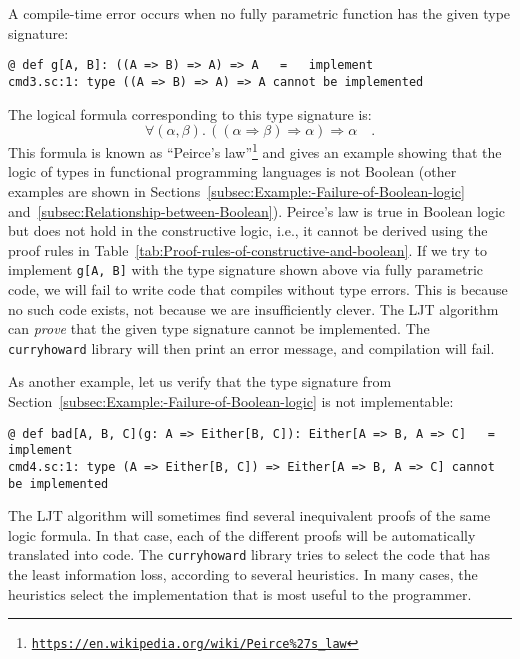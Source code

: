 A compile-time error occurs when no fully parametric function has
the given type signature:
\begin{lstlisting}
@ def g[A, B]: ((A => B) => A) => A   =   implement
cmd3.sc:1: type ((A => B) => A) => A cannot be implemented
\end{lstlisting}
The logical formula corresponding to this type signature is:
\begin{equation}
\forall(\alpha,\beta).\,\left(\left(\alpha\Rightarrow\beta\right)\Rightarrow\alpha\right)\Rightarrow\alpha\quad.\label{eq:ch-example-3-peirce-law}
\end{equation}
This formula is known as \textsf{``}Peirce\textsf{'}s law\textsf{''}\footnote{\texttt{\href{https://en.wikipedia.org/wiki/Peirce\%27s_law}{https://en.wikipedia.org/wiki/Peirce\%27s\_law}}}
and gives an example showing that the logic of types in functional
programming languages is not Boolean (other examples are shown in
Sections~\ref{subsec:Example:-Failure-of-Boolean-logic} and~\ref{subsec:Relationship-between-Boolean}).
Peirce\textsf{'}s law is true in Boolean logic but does not hold in the constructive
logic, i.e., it cannot be derived using the proof rules in Table~\ref{tab:Proof-rules-of-constructive-and-boolean}.
If we try to implement \lstinline!g[A, B]! with the type signature
shown above via fully parametric code, we will fail to write code
that compiles without type errors. This is because no such code exists,
\textemdash{} not because we are insufficiently clever. The LJT algorithm
can \emph{prove} that the given type signature cannot be implemented.
The \lstinline!curryhoward! library will then print an error message,
and compilation will fail.

As another example, let us verify that the type signature from Section~\ref{subsec:Example:-Failure-of-Boolean-logic}
is not implementable:
\begin{lstlisting}
@ def bad[A, B, C](g: A => Either[B, C]): Either[A => B, A => C]   =   implement
cmd4.sc:1: type (A => Either[B, C]) => Either[A => B, A => C] cannot be implemented
\end{lstlisting}

The LJT algorithm will sometimes find several inequivalent proofs
of the same logic formula. In that case, each of the different proofs
will be automatically translated into code. The \lstinline!curryhoward!
library tries to select the code that has the least information loss,
according to several heuristics. In many cases, the heuristics select
the implementation that is most useful to the programmer.

